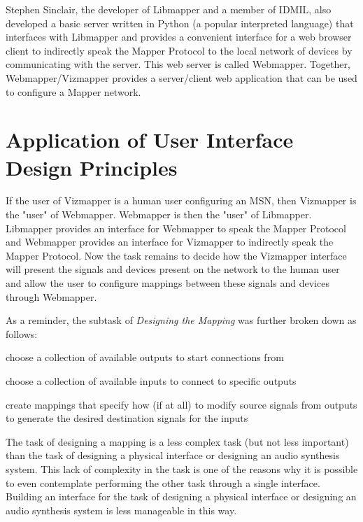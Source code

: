 Stephen Sinclair, the developer of Libmapper and a member of IDMIL, also developed a basic server written in Python (a popular interpreted language) that interfaces with Libmapper and provides a convenient interface for a web browser client to indirectly speak the Mapper Protocol to the local network of devices by communicating with the server. This web server is called Webmapper. Together, Webmapper/Vizmapper provides a server/client web application that can be used to configure a Mapper network.

\section{Application of User Interface Design Principles}
\label{sec:userInterface}

If the user of Vizmapper is a human user configuring an MSN, then Vizmapper is the "user" of Webmapper. Webmapper is then the "user" of Libmapper. Libmapper provides an interface for Webmapper to speak the Mapper Protocol and Webmapper provides an interface for Vizmapper to indirectly speak the Mapper Protocol. Now the task remains to decide how the Vizmapper interface will present the signals and devices present on the network to the human user and allow the user to configure mappings between these signals and devices through Webmapper.

As a reminder, the subtask of \emph{Designing the Mapping} was further broken down as follows:

\begin{description}
	\item choose a collection of available outputs to start connections from
	\item choose a collection of available inputs to connect to specific outputs
	\item create mappings that specify how (if at all) to modify source signals from outputs to generate the desired destination signals for the inputs
\end{description}

The task of designing a mapping is a less complex task (but not less important) than the task of designing a physical interface or designing an audio synthesis system. This lack of complexity in the task is one of the reasons why it is possible to even contemplate performing the other task through a single interface. Building an interface for the task of designing a physical interface or designing an audio synthesis system is less manageable in this way.

